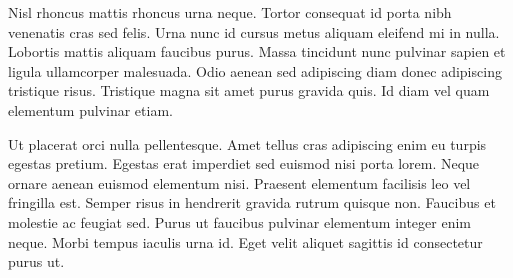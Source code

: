 \documentclass{article}
\begin{document}
 Nisl rhoncus mattis rhoncus urna neque. Tortor consequat id porta nibh venenatis cras sed felis. Urna nunc id cursus metus aliquam eleifend mi in nulla. Lobortis mattis aliquam faucibus purus. Massa tincidunt nunc pulvinar sapien et ligula ullamcorper malesuada. Odio aenean sed adipiscing diam donec adipiscing tristique risus. Tristique magna sit amet purus gravida quis. Id diam vel quam elementum pulvinar etiam.

Ut placerat orci nulla pellentesque. Amet tellus cras adipiscing enim eu turpis egestas pretium. Egestas erat imperdiet sed euismod nisi porta lorem. Neque ornare aenean euismod elementum nisi. Praesent elementum facilisis leo vel fringilla est. Semper risus in hendrerit gravida rutrum quisque non. Faucibus et molestie ac feugiat sed. Purus ut faucibus pulvinar elementum integer enim neque. Morbi tempus iaculis urna id. Eget velit aliquet sagittis id consectetur purus ut.
\end{document}
